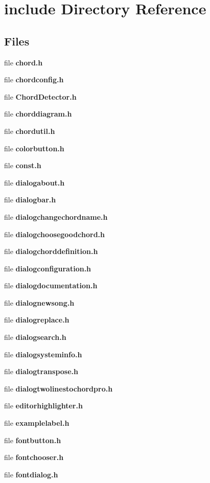 \section{include Directory Reference}
\label{dir_d44c64559bbebec7f509842c48db8b23}
\subsection*{Files}
\begin{DoxyCompactItemize}
\item 
file \textbf{ chord.\+h}
\item 
file \textbf{ chordconfig.\+h}
\item 
file \textbf{ Chord\+Detector.\+h}
\item 
file \textbf{ chorddiagram.\+h}
\item 
file \textbf{ chordutil.\+h}
\item 
file \textbf{ colorbutton.\+h}
\item 
file \textbf{ const.\+h}
\item 
file \textbf{ dialogabout.\+h}
\item 
file \textbf{ dialogbar.\+h}
\item 
file \textbf{ dialogchangechordname.\+h}
\item 
file \textbf{ dialogchoosegoodchord.\+h}
\item 
file \textbf{ dialogchorddefinition.\+h}
\item 
file \textbf{ dialogconfiguration.\+h}
\item 
file \textbf{ dialogdocumentation.\+h}
\item 
file \textbf{ dialognewsong.\+h}
\item 
file \textbf{ dialogreplace.\+h}
\item 
file \textbf{ dialogsearch.\+h}
\item 
file \textbf{ dialogsysteminfo.\+h}
\item 
file \textbf{ dialogtranspose.\+h}
\item 
file \textbf{ dialogtwolinestochordpro.\+h}
\item 
file \textbf{ editorhighlighter.\+h}
\item 
file \textbf{ examplelabel.\+h}
\item 
file \textbf{ fontbutton.\+h}
\item 
file \textbf{ fontchooser.\+h}
\item 
file \textbf{ fontdialog.\+h}
\item 

\end{DoxyCompactItemize}
